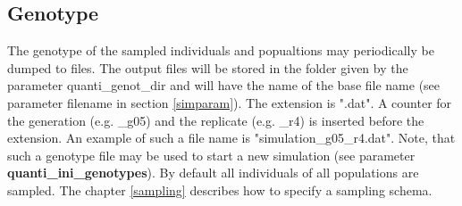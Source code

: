 \documentclass[letterpaper,12pt,oneside]{book}
\begin{document}
\subsection{Genotype}\label{genoQuanti}
The genotype of the sampled individuals and popualtions may periodically be dumped to files. The output files will be stored in the folder given by the parameter \textsf{quanti\_genot\_dir} and will have the name of the base file name (see parameter \textsf{filename} in section \ref{simparam}). The extension is ".dat". A counter for the generation (e.g. \_g05) and the replicate (e.g. \_r4) is inserted before the extension. An example of such a file name is \textsf{"simulation\_g05\_r4.dat"}. Note, that such a genotype file may be used to start a new simulation (see parameter \textbf{quanti\_ini\_genotypes}). By default all individuals of all populations are sampled. The chapter \ref{sampling} describes how to specify a sampling schema.
\end{document}
